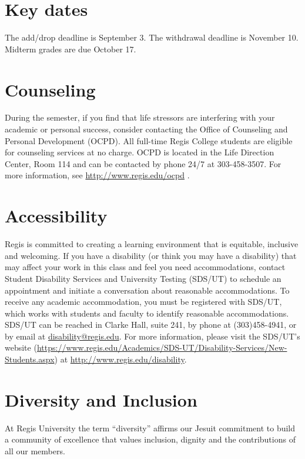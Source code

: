 \documentclass[11pt]{article}
\begin{document}
\section{Key dates}
The add/drop deadline is September 3. The withdrawal deadline is November 10. Midterm grades are due October 17.
{\small
\section{Counseling}

During the semester, if you find that life stressors are interfering with your academic or personal success, consider contacting the Office of Counseling and Personal Development (OCPD). All full-time Regis College students are eligible for counseling services at no charge. OCPD is located in the Life Direction Center, Room 114 and can be contacted by phone 24/7 at 303-458-3507. For more information, see {\url{http://www.regis.edu/ocpd}} .

\section{Accessibility}

Regis is committed to creating a learning environment that is equitable, inclusive and welcoming. If you have a disability (or think you may have a disability) that may affect your work in this class and feel you need accommodations, contact Student Disability Services and University Testing (SDS/UT) to schedule an appointment and initiate a conversation about reasonable accommodations. To receive any academic accommodation, you must be registered with SDS/UT, which works with students and faculty to identify reasonable accommodations.  SDS/UT  can be reached in Clarke Hall, suite 241, by phone at (303)458-4941,  or by email at \url{disability@regis.edu}. For more information, please visit the SDS/UT's website (\url{https://www.regis.edu/Academics/SDS-UT/Disability-Services/New-Students.aspx}) 
at \url{http://www.regis.edu/disability}. 


\section{Diversity and Inclusion}
At Regis University the term ``diversity'' affirms our Jesuit commitment to build a community of excellence that values inclusion, dignity and the contributions of all our members. 

}
\end{document}
